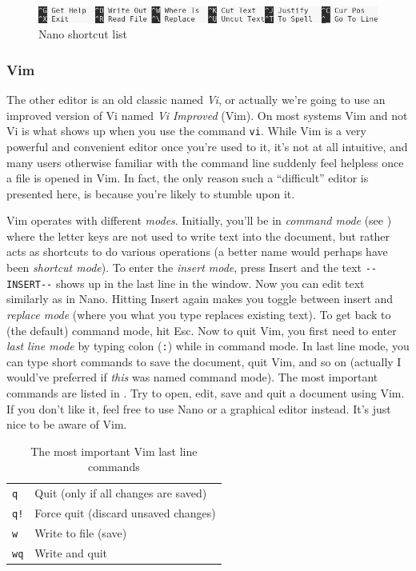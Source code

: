 \begin{figure}
	\centering
	\includegraphics[width=\textwidth]{graphics/nano.png}
	\caption{Nano shortcut list}
	\label{fig:bash:nano}
\end{figure}

\subsubsection{Vim}
The other editor is an old classic named \emph{Vi}, or actually we're going to use an improved version of Vi named \emph{Vi Improved} (Vim). On most systems Vim and not Vi is what shows up when you use the command \verb|vi|. While Vim is a very powerful and convenient editor once you're used to it, it's not at all intuitive, and many users otherwise familiar with the command line suddenly feel helpless once a file is opened in Vim. In fact, the only reason such a ``difficult'' editor is presented here, is because you're likely to stumble upon it.

Vim operates with different \emph{modes}. Initially, you'll be in \emph{command mode} (see ) where the letter keys are not used to write text into the document, but rather acts as shortcuts to do various operations (a better name would perhaps have been \emph{shortcut mode}). To enter the \emph{insert mode}, press Insert and the text \verb|--INSERT--| shows up in the last line in the window. Now you can edit text similarly as in Nano. Hitting Insert again makes you toggle between insert and \emph{replace mode} (where you what you type replaces existing text). To get back to (the default) command mode, hit Esc. Now to quit Vim, you first need to enter \emph{last line mode} by typing colon (\verb|:|) while in command mode. In last line mode, you can type short commands to save the document, quit Vim, and so on (actually I would've preferred if \emph{this} was named command mode). The most important commands are listed in . Try to open, edit, save and quit a document using Vim. If you don't like it, feel free to use Nano or a graphical editor instead. It's just nice to be aware of Vim.

\begin{table}
	\centering
	\caption{The most important Vim last line commands}
	\begin{tabular}{ll}
	\hline
	\verb|q|			&	Quit (only if all changes are saved)	\\
	\verb|q!|		&	Force quit (discard unsaved changes)	\\
	\verb|w|			&	Write to file (save)					\\
	\verb|wq|		&	Write and quit
	\end{tabular}
	\label{tab:bash:vi}
\end{table}

